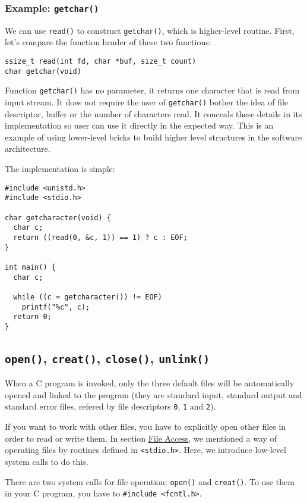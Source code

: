 \documentclass[11pt]{article}
\begin{document}
\subsubsection{Example: \texttt{getchar()}}
\label{sec:org8504117}
We can use \texttt{read()} to construct \texttt{getchar()}, which is higher-level routine. First, let's compare the function header of these two functions:
\begin{verbatim}
ssize_t read(int fd, char *buf, size_t count)
char getchar(void)
\end{verbatim}
Function \texttt{getchar()} has no parameter, it returns one character that is read from input stream. It does not require the user of \texttt{getchar()} bother the idea of file descriptor, buffer or the number of characters read. It conceals these details in its implementation so user can use it directly in the expected way. This is an example of using lower-level bricks to build higher level structures in the software architecture.

The implementation is simple:
\begin{verbatim}
#include <unistd.h>
#include <stdio.h>

char getcharacter(void) {
  char c;
  return ((read(0, &c, 1)) == 1) ? c : EOF;
}

int main() {
  char c;

  while ((c = getcharacter()) != EOF)
    printf("%c", c);
  return 0;
}
\end{verbatim}
\subsection{\texttt{open()}, \texttt{creat()}, \texttt{close()}, \texttt{unlink()}}
\label{sec:org2c3a2c6}
When a C program is invoked, only the three default files will be automatically opened and linked to the program (they are standard input, standard output and standard error files, refered by file descriptors \texttt{0}, \texttt{1} and \texttt{2}).

If you want to work with other files, you have to explicitly open other files in order to read or write them. In section \hyperref[org3c3de33]{File Access}, we mentioned a way of operating files by routines defined in \texttt{<stdio.h>}. Here, we introduce low-level system calls to do this.

There are two system calls for file operation: \texttt{open()} and \texttt{creat()}. To use them in your C program, you have to \texttt{\#include <fcntl.h>}.
\end{document}
